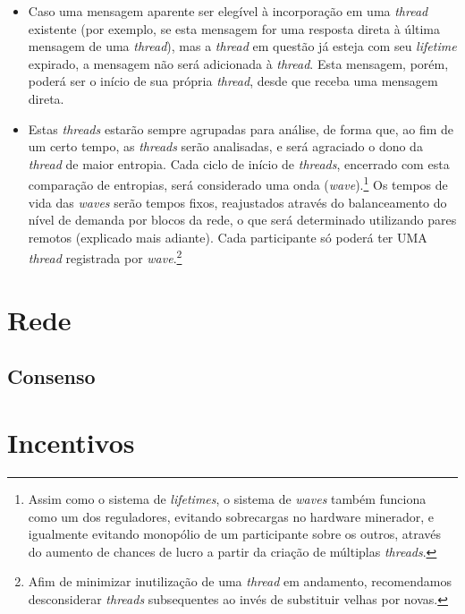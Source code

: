 \documentclass[conference]{IEEEtran}
\begin{document}
\begin{itemize}
\item Caso uma mensagem aparente ser elegível à incorporação em uma \textit{thread} existente (por exemplo, se esta mensagem for uma resposta direta à última mensagem de uma \textit{thread}), mas a \textit{thread} em questão já esteja com seu \textit{lifetime} expirado, a mensagem não será adicionada à \textit{thread}. Esta mensagem, porém, poderá ser o início de sua própria \textit{thread}, desde que receba uma mensagem direta.
\item Estas \textit{threads} estarão sempre agrupadas para análise, de forma que, ao fim de um certo tempo, as \textit{threads} serão analisadas, e será agraciado o dono da \textit{thread} de maior entropia. Cada ciclo de início de \textit{threads}, encerrado com esta comparação de entropias, será considerado uma onda (\textit{wave}).\footnote{Assim como o sistema de \textit{lifetimes}, o sistema de \textit{waves} também funciona como um dos reguladores, evitando sobrecargas no hardware minerador, e igualmente evitando monopólio de um participante sobre os outros, através do aumento de chances de lucro a partir da criação de múltiplas \textit{threads}.} Os tempos de vida das \textit{waves} serão tempos fixos, reajustados através do balanceamento do nível de demanda por blocos da rede, o que será determinado utilizando pares remotos (explicado mais adiante). Cada participante só poderá ter UMA \textit{thread} registrada por \textit{wave}.\footnote{Afim de minimizar inutilização de uma \textit{thread} em andamento, recomendamos desconsiderar \textit{threads} subsequentes ao invés de substituir velhas por novas.}
\end{itemize}

\section{Rede}

\subsection{Consenso}

\section{Incentivos}

\end{document}
